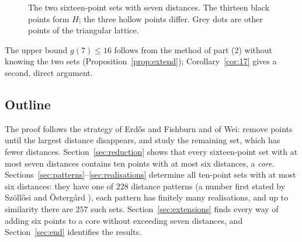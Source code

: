 \documentclass[11pt]{amsart}
\theoremstyle{definition}
\theoremstyle{remark}
\begin{document}
\begin{figure}[t]
\centering
{}
\caption{The two sixteen-point sets with seven distances. The thirteen black points form $H$; the three
hollow points differ. Grey dots are other points of the triangular lattice.}
\label{fig:E}
\end{figure}

The upper bound $g(7)\le16$ follows from the method of part (2) without knowing the two sets
(Proposition~\ref{prop:extend}); Corollary~\ref{cor:17} gives a second, direct argument.

\subsection*{Outline}
The proof follows the strategy of Erdős and Fishburn and of Wei: remove points until the largest distance
disappears, and study the remaining set, which has fewer distances. Section~\ref{sec:reduction} shows
that every sixteen-point set with at most seven distances contains ten points with at most six
distances, a \emph{core}. Sections~\ref{sec:patterns}--\ref{sec:realisations} determine all ten-point sets
with at most six distances: they have one of $228$ distance patterns (a number first stated by Szöllősi and
Östergård \cite{SO}), each pattern has finitely many
realisations, and up to similarity there are $257$ such sets. Section~\ref{sec:extensions} finds every way
of adding six points to a core without exceeding seven distances, and Section~\ref{sec:end} identifies the
results.
\end{document}
